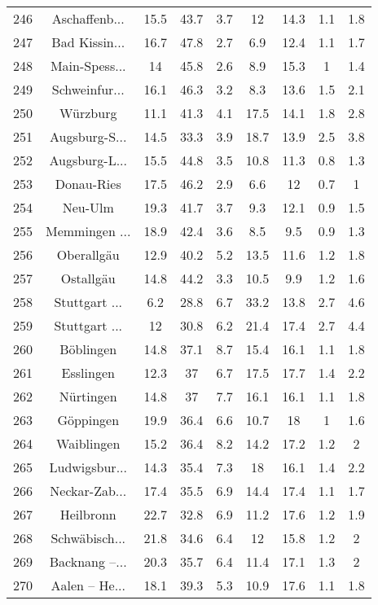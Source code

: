 \begin{table}[!htbp]
\begin{tabular}{@{\extracolsep{5pt}} ccccccccc}
246 & Aschaffenb... & 15.5 & 43.7 & 3.7 & 12 & 14.3 & 1.1 & 1.8 \\ 
247 & Bad Kissin... & 16.7 & 47.8 & 2.7 & 6.9 & 12.4 & 1.1 & 1.7 \\ 
248 & Main-Spess... & 14 & 45.8 & 2.6 & 8.9 & 15.3 & 1 & 1.4 \\ 
249 & Schweinfur... & 16.1 & 46.3 & 3.2 & 8.3 & 13.6 & 1.5 & 2.1 \\ 
250 & Würzburg & 11.1 & 41.3 & 4.1 & 17.5 & 14.1 & 1.8 & 2.8 \\ 
251 & Augsburg-S... & 14.5 & 33.3 & 3.9 & 18.7 & 13.9 & 2.5 & 3.8 \\ 
252 & Augsburg-L... & 15.5 & 44.8 & 3.5 & 10.8 & 11.3 & 0.8 & 1.3 \\ 
253 & Donau-Ries & 17.5 & 46.2 & 2.9 & 6.6 & 12 & 0.7 & 1 \\ 
254 & Neu-Ulm & 19.3 & 41.7 & 3.7 & 9.3 & 12.1 & 0.9 & 1.5 \\ 
255 & Memmingen ... & 18.9 & 42.4 & 3.6 & 8.5 & 9.5 & 0.9 & 1.3 \\ 
256 & Oberallgäu & 12.9 & 40.2 & 5.2 & 13.5 & 11.6 & 1.2 & 1.8 \\ 
257 & Ostallgäu & 14.8 & 44.2 & 3.3 & 10.5 & 9.9 & 1.2 & 1.6 \\ 
258 & Stuttgart ... & 6.2 & 28.8 & 6.7 & 33.2 & 13.8 & 2.7 & 4.6 \\ 
259 & Stuttgart ... & 12 & 30.8 & 6.2 & 21.4 & 17.4 & 2.7 & 4.4 \\ 
260 & Böblingen & 14.8 & 37.1 & 8.7 & 15.4 & 16.1 & 1.1 & 1.8 \\ 
261 & Esslingen & 12.3 & 37 & 6.7 & 17.5 & 17.7 & 1.4 & 2.2 \\ 
262 & Nürtingen & 14.8 & 37 & 7.7 & 16.1 & 16.1 & 1.1 & 1.8 \\ 
263 & Göppingen & 19.9 & 36.4 & 6.6 & 10.7 & 18 & 1 & 1.6 \\ 
264 & Waiblingen & 15.2 & 36.4 & 8.2 & 14.2 & 17.2 & 1.2 & 2 \\ 
265 & Ludwigsbur... & 14.3 & 35.4 & 7.3 & 18 & 16.1 & 1.4 & 2.2 \\ 
266 & Neckar-Zab... & 17.4 & 35.5 & 6.9 & 14.4 & 17.4 & 1.1 & 1.7 \\ 
267 & Heilbronn & 22.7 & 32.8 & 6.9 & 11.2 & 17.6 & 1.2 & 1.9 \\ 
268 & Schwäbisch... & 21.8 & 34.6 & 6.4 & 12 & 15.8 & 1.2 & 2 \\ 
269 & Backnang –... & 20.3 & 35.7 & 6.4 & 11.4 & 17.1 & 1.3 & 2 \\ 
270 & Aalen – He... & 18.1 & 39.3 & 5.3 & 10.9 & 17.6 & 1.1 & 1.8 \\ 

\end{tabular}
\end{table}
